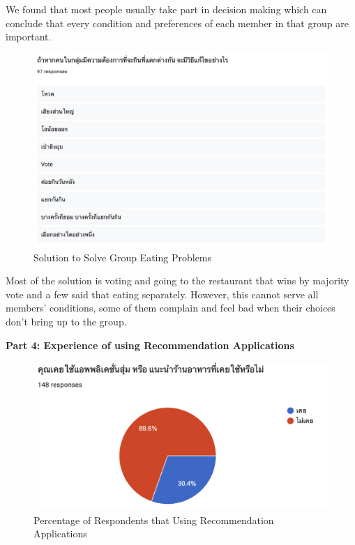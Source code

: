\documentclass[12pt,oneside,openright,a4paper]{cpe-english-project}
\begin{document}
We found that most people usually take part in decision making which can conclude that every condition and preferences of each member in that group are important.

\begin{figure}[H]\centering
\includegraphics[width=350pt]{./images/A1SolutiontoSolveGroupEatingProblems.png}
\caption{Solution to Solve Group Eating Problems}\label{fig:A1SolutiontoSolveGroupEatingProblems}
\end{figure}\vspace{-24pt}

Most of the solution is voting and going to the restaurant that wins by majority vote and a few said that eating separately. However, this cannot serve all members' conditions, some of them complain and feel bad when their choices don't bring up to the group.

\newpage
\textbf{Part 4: Experience of using Recommendation Applications}

\begin{figure}[H]\centering
\includegraphics[width=350pt]{./images/A1PercentageofRespondentsthatUsingRecommendationApplications.png}
\caption{Percentage of Respondents that Using Recommendation Applications}\label{fig:A1PercentageofRespondentsthatUsingRecommendationApplications}
\end{figure}\vspace{-24pt}
\end{document}
